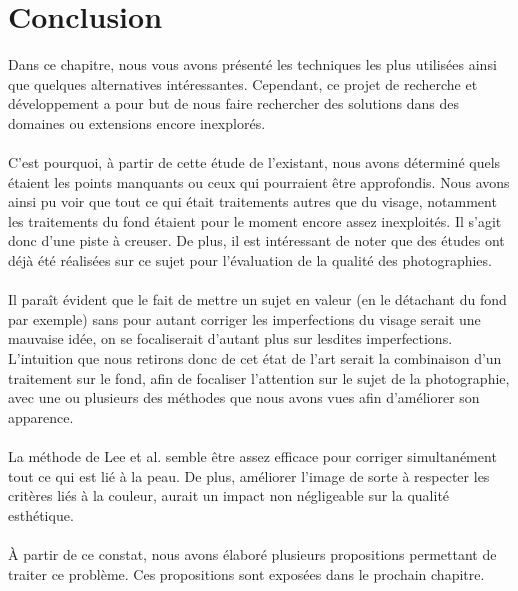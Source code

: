 \documentclass[11pt, french]{report-rd-info}
\begin{document}
\newpage
\section{Conclusion}
Dans ce chapitre, nous vous avons présenté les techniques les plus utilisées ainsi que quelques alternatives intéressantes. Cependant, ce projet de recherche et développement a pour but de nous faire rechercher des solutions dans des domaines ou extensions encore inexplorés.
\paragraph*{}
C’est pourquoi, à partir de cette étude de l’existant, nous avons déterminé quels étaient les points manquants ou ceux qui pourraient être approfondis. Nous avons ainsi pu voir que tout ce qui était traitements autres que du visage, notamment les traitements du fond étaient pour le moment encore assez inexploités. Il s’agit donc d’une piste à creuser. De plus, il est intéressant de noter que des études ont déjà été réalisées sur ce sujet pour l’évaluation de la qualité des photographies.
\paragraph*{}
Il paraît évident que le fait de mettre un sujet en valeur (en le détachant du fond par exemple) sans pour autant corriger les imperfections du visage serait une mauvaise idée, on se focaliserait d’autant plus sur lesdites imperfections. L’intuition que nous retirons donc de cet état de l’art serait la combinaison d’un traitement sur le fond, afin de focaliser l’attention sur le sujet de la photographie, avec une ou plusieurs des méthodes que nous avons vues afin d’améliorer son apparence. 
\paragraph*{}
La méthode de Lee et al. \cite{Lee} semble être assez efficace pour corriger simultanément tout ce qui est lié à la peau. De plus, améliorer l'image de sorte à respecter les critères liés à la couleur, aurait un impact non négligeable sur la qualité esthétique. 
\paragraph*{}
À partir de ce constat, nous avons élaboré plusieurs propositions permettant de traiter ce problème. Ces propositions sont exposées dans le prochain chapitre.
\end{document}
